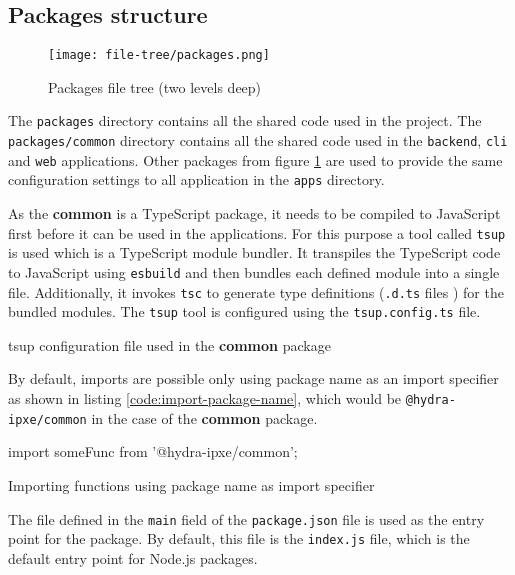 \documentclass[../main.tex]{subfiles}
\begin{document}
\subsection{Packages structure}

\begin{figure}[H]
  \centering
  \texttt{[image: file-tree/packages.png]}
  \caption{Packages file tree (two levels deep)}
  \label{fig:packages-file-tree}
\end{figure}

The \texttt{packages} directory contains all the shared code used in the project.
The \texttt{packages/common} directory contains all the shared code used in the \texttt{backend}, \texttt{cli} and \texttt{web} applications.
Other packages from figure \ref{fig:packages-file-tree} are used to provide the same configuration settings to all application in the \texttt{apps} directory.

As the \textbf{common} is a TypeScript package, it needs to be compiled to JavaScript first before it can be used in the applications.
For this purpose a tool called \texttt{tsup} \cite{tsup} is used which is a TypeScript module bundler.
It transpiles the TypeScript code to JavaScript using \texttt{esbuild} \cite{esbuild} and then bundles each defined module into a single file.
Additionally, it invokes \texttt{tsc} to generate type definitions (\texttt{.d.ts} files \cite{typescript-d-ts}) for the bundled modules.
The \texttt{tsup} tool is configured using the \texttt{tsup.config.ts} file.

\begin{listing}[H]
  \caption{tsup configuration file used in the \textbf{common} package}
  \label{code:tsup-config}
\end{listing}

By default, imports are possible only using package name as an import specifier as shown in listing \ref{code:import-package-name},
which would be \texttt{@hydra-ipxe/common} in the case of the \textbf{common} package.

\begin{listing}[H]
  \begin{tscode}
    import { someFunc } from '@hydra-ipxe/common';
  \end{tscode}
  \caption{Importing functions using package name as import specifier}
  \label{code:import-package-name}
\end{listing}

The file defined in the \texttt{main} field of the \texttt{package.json} file is used as the entry point for the package.
By default, this file is the \texttt{index.js} file, which is the default entry point for Node.js packages.
\end{document}
